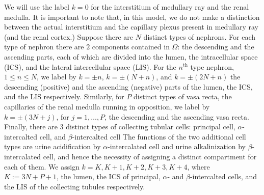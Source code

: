\documentclass{article}
\begin{document}
We will use the label
$k=0$ for the interstitium of medullary ray and the renal medulla.
It is important to note that, in this model, we do not make a distinction between the actual interstitium and the capillary plexus present in medullary ray (and the renal cortex.)
Suppose there are $N$ distinct types of nephrons.
For each type of nephron there are $2$ components contained in $\Omega$: the descending and the ascending parts, each of which are divided into the lumen, the intracellular space (ICS), and the lateral intercellular space (LIS).
For the $n^{\mathrm{th}}$ type nephron, $1\leq n\leq N$, we label by $k=\pm n$, $k=\pm(N+n)$, and $k=\pm(2N+n)$ the descending (positive) and the ascending (negative) parts of the lumen, the ICS, and the LIS respectively.
Similarly, for $P$ distinct types of vasa recta, the capillaries of the renal medulla running in opposition, we label by $k=\pm(3N+j)$, for $j=1,\dots,P$, the descending and the ascending vasa recta.
Finally, there are 3 distinct types of collecting tubular cells: principal cell, $\alpha$-intercalted cell, and $\beta$-intercalted cell
The functions of the two additional cell types are urine acidification by $\alpha$-intercalated cell and urine alkalinization by $\beta$-intercalated cell, and hence the necessity of assigning a distinct compartment for each of them.
We assign $k=K,K+1,K+2,K+3,K+4$, where $K:=3N+P+1$, the lumen, the ICS of principal, $\alpha$- and $\beta$-intercalted cells, and the LIS of the collecting tubules respectively.
\end{document}
